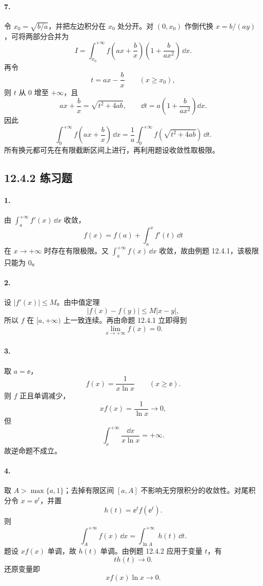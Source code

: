 \paragraph{7.}
令 $x_0=\sqrt{b/a}$，并把左边积分在 $x_0$ 处分开。对 $(0,x_0)$ 作倒代换 $x=b/(ay)$，可将两部分合并为
\[
  I=\int_{x_0}^{+\infty}f\left(ax+\frac bx\right)
  \left(1+\frac b{ax^2}\right)\,\dd x.
\]
再令
\[
  t=ax-\frac bx\qquad(x\geq x_0),
\]
则 $t$ 从 $0$ 增至 $+\infty$，且
\[
  ax+\frac bx=\sqrt{t^2+4ab},
  \qquad
  \dd t=a\left(1+\frac b{ax^2}\right)\dd x.
\]
因此
\[
  \boxed{
  \int_0^{+\infty}f\left(ax+\frac bx\right)\,\dd x
  =\frac1a\int_0^{+\infty}f(\sqrt{t^2+4ab})\,\dd t.}
\]
所有换元都可先在有限截断区间上进行，再利用题设收敛性取极限。

\subsection*{12.4.2 练习题}

\paragraph{1.}
由 $\int_a^{+\infty}f'(x)\,\dd x$ 收敛，
\[
  f(x)=f(a)+\int_a^x f'(t)\,\dd t
\]
在 $x\to+\infty$ 时存在有限极限。又 $\int_a^{+\infty}f(x)\,\dd x$ 收敛，故由例题 12.4.1，该极限只能为 $0$。

\paragraph{2.}
设 $|f'(x)|\leq M$。由中值定理
\[
  |f(x)-f(y)|\leq M|x-y|,
\]
所以 $f$ 在 $[a,+\infty)$ 上一致连续。再由命题 12.4.1 立即得到
\[
  \boxed{\lim_{x\to+\infty}f(x)=0}.
\]

\paragraph{3.}
取 $a=\ee$，
\[
  f(x)=\frac1{x\ln x}\qquad(x\geq\ee).
\]
则 $f$ 正且单调减少，
\[
  xf(x)=\frac1{\ln x}\to0,
\]
但
\[
  \int_\ee^{+\infty}\frac{\dd x}{x\ln x}=+\infty.
\]
故逆命题不成立。

\paragraph{4.}
取 $A>\max\{a,1\}$；去掉有限区间 $[a,A]$ 不影响无穷限积分的收敛性。对尾积分令 $x=\ee^t$，并置
\[
  h(t)=\ee^t f(\ee^t).
\]
则
\[
  \int_A^{+\infty}f(x)\,\dd x
  =\int_{\ln A}^{+\infty}h(t)\,\dd t.
\]
题设 $xf(x)$ 单调，故 $h(t)$ 单调。由例题 12.4.2 应用于变量 $t$，有
\[
  t h(t)\to0.
\]
还原变量即
\[
  \boxed{xf(x)\ln x\to0}.
\]

